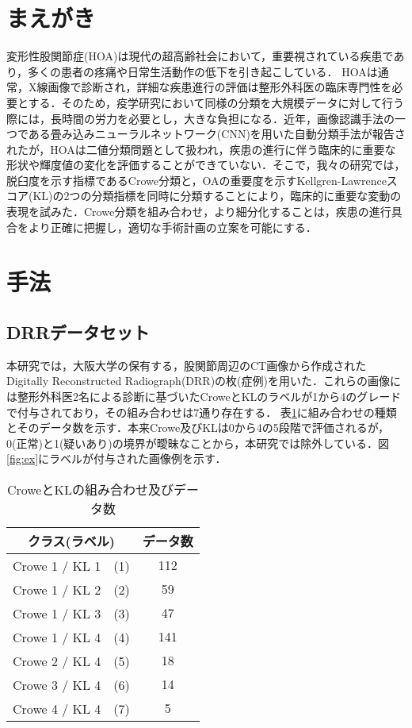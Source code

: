 \documentclass[technicalreport]{ieicej}
\begin{document}
\clearpage

\section{まえがき}
変形性股関節症(HOA)は現代の超高齢社会において，重要視されている疾患であり，多くの患者の疼痛や日常生活動作の低下を引き起こしている．
HOAは通常，X線画像で診断され，詳細な疾患進行の評価は整形外科医の臨床専門性を必要とする．そのため，疫学研究において同様の分類を大規模データに対して行う際には，長時間の労力を必要とし，大きな負担になる．近年，画像認識手法の一つである畳み込みニューラルネットワーク(CNN)を用いた自動分類手法が報告されたが\cite{Gebre2021DetectingHO}，HOAは二値分類問題として扱われ，疾患の進行に伴う臨床的に重要な形状や輝度値の変化を評価することができていない．そこで，我々の研究では，脱臼度を示す指標であるCrowe分類と，OAの重要度を示すKellgren-Lawrenceスコア(KL)\cite{kellgren1957radiological}の2つの分類指標を同時に分類することにより，臨床的に重要な変動の表現を試みた．Crowe分類を組み合わせ，より細分化することは，疾患の進行具合をより正確に把握し，適切な手術計画の立案を可能にする．

\section{手法}
\label{sec:cls}
\subsection{DRRデータセット}
\label{sec:technicalreport}
本研究では，大阪大学の保有する，股関節周辺のCT画像から作成されたDigitally Reconstructed Radiograph(DRR)の枚(症例)を用いた．これらの画像には整形外科医2名による診断に基づいたCroweとKLのラベルが1から4のグレードで付与されており，その組み合わせは7通り存在する． 表\ref{tb:dist}に組み合わせの種類とそのデータ数を示す．本来Crowe及びKLは0から4の5段階で評価されるが，0(正常)と1(疑いあり)の境界が曖昧なことから，本研究では除外している．図\ref{fig:ex}にラベルが付与された画像例を示す．

\begin{table}[h]
  \caption{CroweとKLの組み合わせ及びデータ数}
  \label{tb:dist}
  \centering
  \begin{tabular}{c|c}\hline
    クラス(ラベル) & データ数\\
    \hline\hline
    Crowe 1 / KL 1　(1) & 112\\\hline
    Crowe 1 / KL 2　(2) & 59\\\hline
    Crowe 1 / KL 3　(3) & 47\\\hline
    Crowe 1 / KL 4　(4) & 141\\\hline
    Crowe 2 / KL 4　(5) & 18\\\hline
    Crowe 3 / KL 4　(6) & 14\\\hline
    Crowe 4 / KL 4　(7) & 5\\\hline
  \end{tabular}
\end{table}
\end{document}
